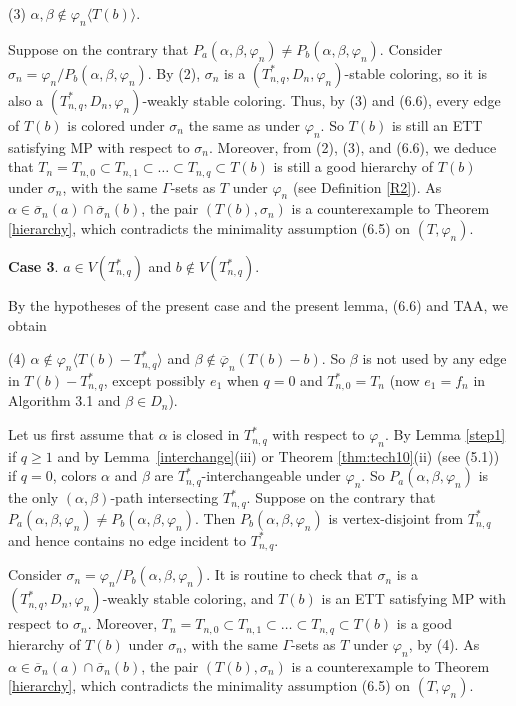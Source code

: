 \documentclass[11pt]{article}
\begin{document}
(3) $\alpha,\beta\notin\varphi_n \langle T(b) \rangle$. 

\noindent Suppose on the contrary that $P_a(\alpha,\beta,\varphi_n)\neq P_{b}(\alpha,\beta,\varphi_n)$. 
Consider $\sigma_n=\varphi_n/P_{b}(\alpha,\beta,\varphi_n)$. By (2), $\sigma_n$ is a $(T_{n,q}^*, D_n,\varphi_n)$-stable coloring, so it is 
also a $(T_{n,q}^*, D_n,\varphi_n)$-weakly stable coloring. Thus, by (3) and (6.6),  every edge of $T(b)$ is colored under $\sigma_n$ the same as under 
$\varphi_n$. So $T(b)$ is still an ETT satisfying MP with respect to $\sigma_n$. Moreover, from (2), (3), and (6.6), we deduce that $T_n=T_{n,0} 
\subset T_{n,1}  \subset \ldots \subset T_{n,q} \subset T(b)$ is still a good hierarchy of $T(b)$ under $\sigma_n$, with the same $\Gamma$-sets 
as $T$ under $\varphi_n$ (see Definition \ref{R2}). As $\alpha\in\overline{\sigma}_n(a)\cap \overline{\sigma}_n(b)$, the pair $(T(b), \sigma_n)$ 
is a counterexample to Theorem \ref{hierarchy}, which contradicts the minimality assumption (6.5) on $(T, \varphi_n)$.

{\bf Case 3}. $a \in V(T_{n,q}^*)$ and $b \notin V(T_{n,q}^*).$ 

By the hypotheses of the present case and the present lemma, (6.6) and TAA, we obtain

(4) $\alpha \notin \varphi_n \langle T(b) -  T_{n,q}^* \rangle$ and $\beta \notin \overline{\varphi}_n (T(b)-b)$.
So $\beta$ is not used by any edge in $T(b) -  T_{n,q}^*$, except possibly $e_1$ when $q=0$ and $T_{n,0}^*=T_n$ 
(now $e_1=f_n$ in Algorithm 3.1 and $\beta \in D_n$). 


Let us first assume that $\alpha$ is closed in $T_{n,q}^*$ with respect to $\varphi_n$. By Lemma \ref{step1} if $q \ge 1$ 
and by Lemma~\ref{interchange}(iii) or Theorem \ref{thm:tech10}(ii) (see (5.1)) if $q=0$, colors $\alpha$ and $\beta$ are $T_{n,q}^*$-interchangeable under $\varphi_n$. So $P_{a}(\alpha,\beta,\varphi_n)$ is the only $(\alpha,\beta)$-path 
intersecting $T_{n,q}^*$.  Suppose on the contrary that $P_{a}(\alpha,\beta,\varphi_n) \ne P_{b}(\alpha,\beta,\varphi_n)$. 
Then  $P_{b}(\alpha,\beta,\varphi_n)$ is vertex-disjoint from $T_{n,q}^*$ and hence contains no edge incident to $T_{n,q}^*$.

Consider $\sigma_n=\varphi_n/P_{b}(\alpha,\beta,\varphi_n)$.  It is routine to check 
that $\sigma_n$ is a $(T_{n,q}^*, D_n,\varphi_n)$-weakly stable coloring, and $T(b)$ is an ETT 
satisfying MP with respect to $\sigma_n$. Moreover, $T_n=T_{n,0} \subset T_{n,1}  \subset \ldots \subset T_{n,q} 
\subset T(b)$ is a good hierarchy of $T(b)$ under $\sigma_n$, with the same $\Gamma$-sets as $T$ under $\varphi_n$,
by (4). As $\alpha\in\overline{\sigma}_n(a)\cap \overline{\sigma}_n(b)$, the pair $(T(b), \sigma_n)$ 
is a counterexample to Theorem \ref{hierarchy}, which contradicts the minimality assumption (6.5) on $(T, \varphi_n)$. 
\end{document}
